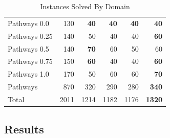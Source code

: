 \documentclass{article}
\begin{document}
\begin{table}
\begin{tabular}{|l|r|rrrr|}
Pathways 0.0 	&		130		&	{\bf	40}	&	{\bf	40}	&	{\bf	40}	&	{\bf	40}	\\	
Pathways 0.25 	&		140		&		50		&		40		&		40		&	{\bf	60}	\\	
Pathways 0.5 	&		140		&	{\bf	70}	&		60		&		50		&		60		\\	
Pathways 0.75 	&		150		&	{\bf	60}	&		40		&		40		&	{\bf	60}	\\	
Pathways 1.0 	&		170		&		50		&		60		&		60		&	{\bf	70}	\\	\hline
Pathways 	&		870		&		320		&		290		&		280		&	{\bf	340}	\\	\hline\hline
Total	&		2011		&		1214		&		1182		&		1176		&	{\bf	1320}	\\	
\hline																						
\end{tabular}	\caption{\label{tab:solved} Instances Solved By Domain}																					
\end{table}																										
								

\subsection{Results}
\end{document}
